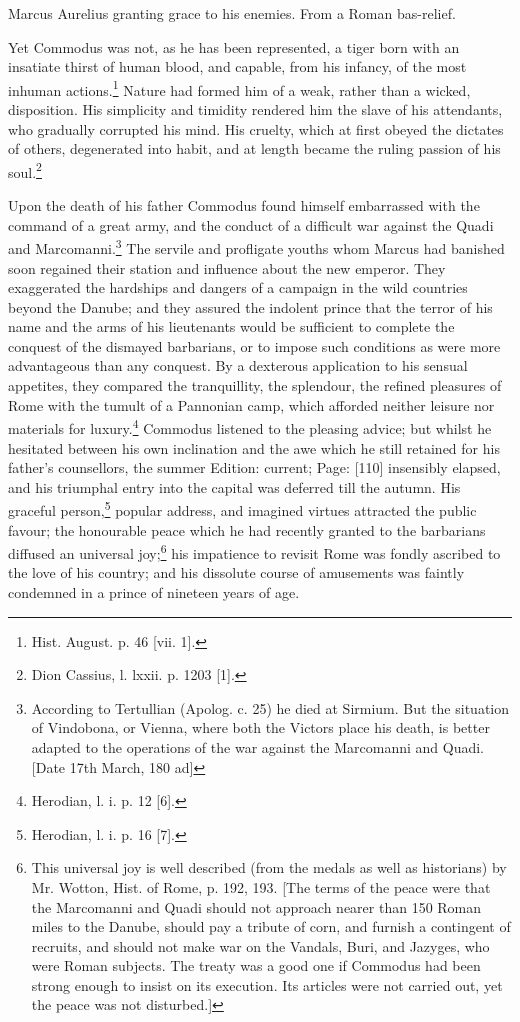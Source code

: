 Marcus Aurelius granting grace to his enemies. From a Roman bas-relief.

Yet Commodus was not, as he has been represented, a tiger born with an insatiate thirst of human blood, and capable, from his infancy, of the most inhuman actions.\footnote{Hist. August. p. 46 [vii. 1].} Nature had formed him of a weak, rather than a wicked, disposition. His simplicity and timidity rendered him the slave of his attendants, who gradually corrupted his mind. His cruelty, which at first obeyed the dictates of others, degenerated into habit, and at length became the ruling passion of his soul.\footnote{Dion Cassius, l. lxxii. p. 1203 [1].}

Upon the death of his father Commodus found himself embarrassed with the command of a great army, and the conduct of a difficult war against the Quadi and Marcomanni.\footnote{According to Tertullian (Apolog. c. 25) he died at Sirmium. But the situation of Vindobona, or Vienna, where both the Victors place his death, is better adapted to the operations of the war against the Marcomanni and Quadi. [Date 17th March, 180 ad]} The servile and profligate youths whom Marcus had banished soon regained their station and influence about the new emperor. They exaggerated the hardships and dangers of a campaign in the wild countries beyond the Danube; and they assured the indolent prince that the terror of his name and the arms of his lieutenants would be sufficient to complete the conquest of the dismayed barbarians, or to impose such conditions as were more advantageous than any conquest. By a dexterous application to his sensual appetites, they compared the tranquillity, the splendour, the refined pleasures of Rome with the tumult of a Pannonian camp, which afforded neither leisure nor materials for luxury.\footnote{Herodian, l. i. p. 12 [6].} Commodus listened to the pleasing advice; but whilst he hesitated between his own inclination and the awe which he still retained for his father\texthebrew{}’s counsellors, the summer Edition: current; Page: [110] insensibly elapsed, and his triumphal entry into the capital was deferred till the autumn. His graceful person,\footnote{Herodian, l. i. p. 16 [7].} popular address, and imagined virtues attracted the public favour; the honourable peace which he had recently granted to the barbarians diffused an universal joy;\footnote{This universal joy is well described (from the medals as well as historians) by Mr. Wotton, Hist. of Rome, p. 192, 193. [The terms of the peace were that the Marcomanni and Quadi should not approach nearer than 150 Roman miles to the Danube, should pay a tribute of corn, and furnish a contingent of recruits, and should not make war on the Vandals, Buri, and Jazyges, who were Roman subjects. The treaty was a good one if Commodus had been strong enough to insist on its execution. Its articles were not carried out, yet the peace was not disturbed.]} his impatience to revisit Rome was fondly ascribed to the love of his country; and his dissolute course of amusements was faintly condemned in a prince of nineteen years of age.

